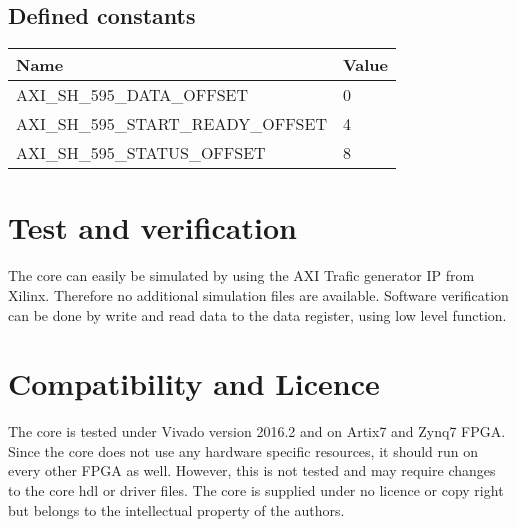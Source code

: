\subsection{Defined constants}

\begin{table}[h]
	\centering
	\label{tbl::software_defines}
	\begin{tabular}{l|l}
		Name & Value \\
		\hline 
		AXI\_SH\_595\_DATA\_OFFSET & 0 \\
		\hline 
		AXI\_SH\_595\_START\_READY\_OFFSET & 4 \\
		\hline 
		AXI\_SH\_595\_STATUS\_OFFSET & 8 \\
	\end{tabular} 
	
\end{table}


\section{Test and verification}
\label{sec::test}

The core can easily be simulated by using the AXI Trafic generator IP from Xilinx.
Therefore no additional simulation files are available.
Software verification can be done by write and read data to the data register, using low level function.

\section{Compatibility and Licence}
The core is tested under Vivado version 2016.2 and on Artix7 and Zynq7 FPGA.
Since the core does not use any hardware specific resources, it should run on every other FPGA as well.
However, this is not tested and may require changes to the core hdl or driver files.
The core is supplied under no licence or copy right but belongs to the intellectual property of the authors.

